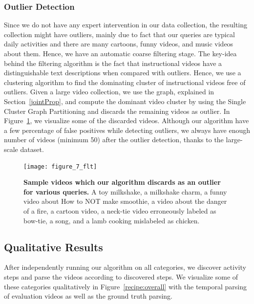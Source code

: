 \subsubsection{Outlier Detection}
\label{filter}
\vspace{-1mm}
Since we do not have any expert intervention in our data collection, the resulting collection might have outliers, mainly due to fact that our queries are typical daily activities and there are many cartoons, funny videos, and music videos about them. Hence, we have an automatic coarse filtering stage. The key-idea behind the filtering algorithm is the fact that instructional videos have a distinguishable text descriptions when compared with outliers. Hence, we use a clustering algorithm to find the dominating cluster of instructional videos free of outliers. Given a large video collection, we use the graph, explained in Section~\ref{jointProp}, and compute the dominant video cluster by using the Single Cluster Graph Partitioning \cite{scgp} and discards the remaining videos as outlier. In Figure~\ref{outliers}, we visualize some of the discarded videos. Although our algorithm have a few percentage of false positives while detecting outliers, we always have enough number of videos (minimum 50) after the outlier detection, thanks to the large-scale dataset.

\begin{figure}[ht]
    \texttt{[image: figure\_7\_flt]}
\caption{\textbf{Sample videos which our algorithm discards as an outlier for various queries.}
A toy milkshake, a milkshake charm, a funny video about How to NOT make smoothie, a video about the danger of a fire, a cartoon video, a neck-tie video erroneously labeled as bow-tie, a song, and a lamb cooking mislabeled as chicken.}
\label{outliers}
\vspace{-3mm}
\end{figure}

\vspace{-1mm}
\subsection{Qualitative Results}
\vspace{-1mm}
After independently running our algorithm on all categories, we discover activity steps and parse the videos according to discovered steps. We visualize some of these categories qualitatively in Figure~\ref{recipe:overall} with the temporal parsing of evaluation videos as well as the ground truth parsing.

